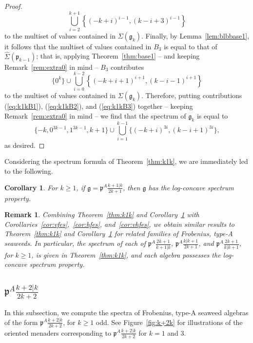 \documentclass[letterpaper,10pt]{article}
\newtheorem{corollary}[theorem]{Corollary}
\newtheorem{remark}[theorem]{Remark}
\begin{document}
\begin{proof}
\begin{equation}\label{eq:k1kB2}
    \bigcup_{i=2}^{k+1}\left\{(-k+i)^{i-1},(k-i+3)^{i-1}\right\}
\end{equation}
to the multiset of values contained in $\Sigma(\mathfrak{g}_k)$.  Finally, by Lemma~\ref{lem:blbbase1}, it follows that the multiset of values contained in $B_3$ is equal to that of $\widehat{\Sigma}(\mathfrak{p}_{k-1})$; that is, applying Theorem~\ref{thm:base1} -- and keeping Remark~\ref{rem:extra0} in mind -- $B_3$ contributes 
\begin{equation}\label{eq:k1kB3}
    \{0^{k}\}\cup\bigcup_{i=0}^{k-2}\left\{(-k+i+1)^{i+1},(k-i-1)^{i+1}\right\}
\end{equation}
to the multiset of values contained in $\Sigma(\mathfrak{g}_k)$. Therefore, putting contributions (\ref{eq:k1kB1}), (\ref{eq:k1kB2}), and (\ref{eq:k1kB3}) together -- keeping Remark~\ref{rem:extra0} in mind -- we find that the spectrum of $\mathfrak{g}_k$ is equal to$$\{-k,0^{3k-1},1^{3k-1},k+1\}\cup\bigcup_{i=1}^{k-1}\{(-k+i)^{3i},(k-i+1)^{3i}\},$$ as desired.
\end{proof}

Considering the spectrum formula of Theorem~\ref{thm:k1k}, we are immediately led to the following.

\begin{corollary}\label{cor:logk1k}
For $k\ge 1$, if $\mathfrak{g}=\mathfrak{p}^A\frac{k+1|k}{2k+1}$, then $\mathfrak{g}$ has the log-concave spectrum property.
\end{corollary}

\begin{remark}
    Combining Theorem~\ref{thm:k1k} and Corollary~\ref{cor:logk1k} with Corollaries~\ref{cor:vfes},~\ref{cor:hfes}, and~\ref{cor:vhfes}, we obtain similar results to Theorem~\ref{thm:k1k} and Corollary~\ref{cor:logk1k} for related families of Frobenius, type-A seaweeds. In particular, the spectrum of each of $\mathfrak{p}^A\frac{2k+1}{k+1|k}$, $\mathfrak{p}^A\frac{k|k+1}{2k+1}$, and $\mathfrak{p}^A\frac{2k+1}{k|k+1}$, for $k\ge 1$, is given in Theorem~\ref{thm:k1k}, and each algebra possesses the log-concave spectrum property.
\end{remark}



\subsection{$\mathfrak{p}^A\frac{k+2|k}{2k+2}$}
In this subsection, we compute the spectra of Frobenius, type-A seaweed algebras of the form $\mathfrak{p}^A\frac{k+2|k}{2k+2}$, for $k\geq 1$ odd. See Figure~\ref{fig:k+2k} for illustrations of the oriented menaders corresponding to $\mathfrak{p}^A\frac{k+2|k}{2k+2}$ for $k=1$ and $3.$
\end{document}
